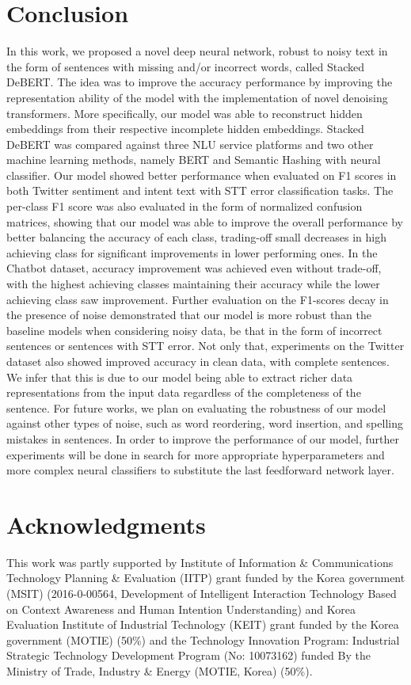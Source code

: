 \documentclass[review]{elsarticle}
\begin{document}
\section{Conclusion}
\label{sec:conclusion}
In this work, we proposed a novel deep neural network, robust to noisy text in the form of sentences with missing and/or incorrect words, called Stacked DeBERT. The idea was to improve the accuracy performance by improving the representation ability of the model with the implementation of novel denoising transformers. More specifically, our model was able to reconstruct hidden embeddings from their respective incomplete hidden embeddings. Stacked DeBERT was compared against three NLU service platforms and two other machine learning methods, namely BERT and Semantic Hashing with neural classifier. Our model showed better performance when evaluated on F1 scores in both Twitter sentiment and intent text with STT error classification tasks. The per-class F1 score was also evaluated in the form of normalized confusion matrices, showing that our model was able to improve the overall performance by better balancing the accuracy of each class, trading-off small decreases in high achieving class for significant improvements in lower performing ones. In the Chatbot dataset, accuracy improvement was achieved even without trade-off, with the highest achieving classes maintaining their accuracy while the lower achieving class saw improvement. Further evaluation on the F1-scores decay in the presence of noise demonstrated that our model is more robust than the baseline models when considering noisy data, be that in the form of incorrect sentences or sentences with STT error. Not only that, experiments on the Twitter dataset also showed improved accuracy in clean data, with complete sentences. We infer that this is due to our model being able to extract richer data representations from the input data regardless of the completeness of the sentence. For future works, we plan on evaluating the robustness of our model against other types of noise, such as word reordering, word insertion, and spelling mistakes in sentences. In order to improve the performance of our model, further experiments will be done in search for more appropriate hyperparameters and more complex neural classifiers to substitute the last feedforward network layer.

\section*{Acknowledgments}
This work was partly supported by Institute of Information \& Communications Technology Planning \& Evaluation (IITP) grant funded by the Korea government (MSIT) (2016-0-00564, Development of Intelligent Interaction Technology Based on Context Awareness and Human Intention Understanding) and Korea Evaluation Institute of Industrial Technology (KEIT) grant funded by the Korea government (MOTIE) (50\%) and the Technology Innovation Program: Industrial Strategic Technology Development Program (No: 10073162) funded By the Ministry of Trade, Industry \& Energy (MOTIE, Korea) (50\%).



\end{document}
